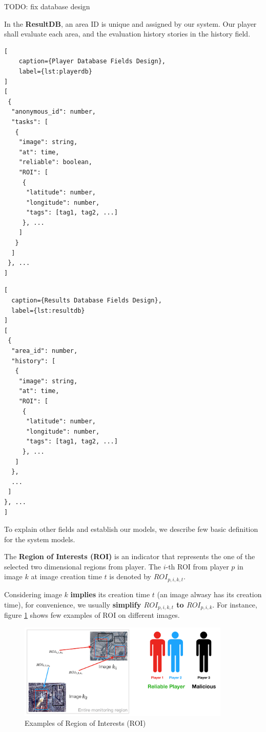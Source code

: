 TODO: fix database design

In the \textbf{ResultDB}, an area ID is unique and assigned by our system. 
Our player shall evaluate each area, and the evaluation history stories in the history field.


\noindent\begin{minipage}{.45\textwidth}
\begin{lstlisting}[
    caption={Player Database Fields Design},
    label={lst:playerdb}
]
[
 {
  "anonymous_id": number,
  "tasks": [
   {
    "image": string,
    "at": time,
    "reliable": boolean,
    "ROI": [
     {
      "latitude": number,
      "longitude": number,
      "tags": [tag1, tag2, ...]
     }, ...
    ]
   }
  ]
 }, ...
]
\end{lstlisting}
\end{minipage}\hfill
\begin{minipage}{.45\textwidth}
\begin{lstlisting}[
  caption={Results Database Fields Design},
  label={lst:resultdb}
]
[
 {
  "area_id": number,
  "history": [
   {
    "image": string,
    "at": time,   
    "ROI": [
     {
      "latitude": number,
      "longitude": number,
      "tags": [tag1, tag2, ...]
     }, ...
   ]
  }, 
  ...
 ]
}, ...
]
\end{lstlisting}
\end{minipage}

To explain other fields and establish our models, we describe few basic definition for the system models.

\begin{definition}
\label{def:roi}
The \textbf{Region of Interests (ROI)} is an indicator that represents the one of the selected two dimensional regions from player. 
The $i$-th ROI from player $p$ in image $k$ at image creation time $t$ is denoted by $ROI_{p,i,k,t}$.
\end{definition}

Considering image $k$ \textbf{implies} its creation time $t$ (an image alwasy has its creation time), for convenience, 
we usually \textbf{simplify $ROI_{p,i,k,t}$ to $ROI_{p,i,k}$}.
For instance, figure \ref{fig:roi} shows few examples of ROI on different images.

\begin{figure}[htp]
\centering
\includegraphics[width=0.9\textwidth]{figures/roi}
\caption{Examples of Region of Interests (ROI)}
\label{fig:roi}
\end{figure}

